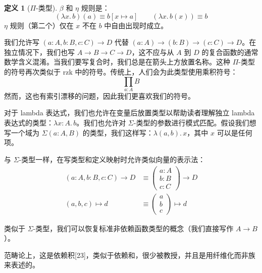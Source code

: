\documentclass{ctexrep}
\theoremstyle{plain}
\theoremstyle{definition}
\newtheorem{definition}[theorem]{定义}
\theoremstyle{remark}
\theoremstyle{definition}
\theoremstyle{definition}
\theoremstyle{definition}
\begin{document}
\begin{definition}[$\Pi$-类型]
$\beta$ 和 $\eta$ 规则是：
\[
(\lambda x.\,b)(a)\equiv b[x\mapsto a] \qquad (\lambda x.\,b(x))\equiv b
\]
$\eta$ 规则（第二个）仅在 $x$ 不在 $b$ 中自由出现时成立。

我们允许写 $(a:A,b:B,c:C)\to D$ 代替 $(a:A)\to (b:B)\to (c:C)\to D$。在独立情况下，我们也写 $A\to B\to C\to D$，这不应与从 $A$ 到 $D$ 的复合函数的通常数学含义混淆。当我们要写复合时，我们总是在箭头上方放置名称。这种 $\Pi$-类型的符号再次类似于 \textsf{rzk} 中的符号。传统上，人们会为此类型使用乘积符号：
\[
\prod_{a:A}B
\]
然而，这也有索引漂移的问题，因此我们更喜欢我们的符号。

对于 lambda 表达式，我们也允许在变量后放置类型以帮助读者理解独立 lambda 表达式的类型：$\lambda x:A.\,b$。我们也允许对 $\Sigma$-类型的参数进行模式匹配。假设我们想写一个域为 $\Sigma(a:A,B)$ 的类型，我们这样写：$\lambda (a,b).\,x$，其中 $x$ 可以是任何项。

与 $\Sigma$-类型一样，在写类型和定义映射时允许类似向量的表示法：
\begin{align*}
(a : A, b : B, c : C) \to D &\equiv 
\begin{pmatrix} 
a : A \\ 
b : B \\ 
c : C 
\end{pmatrix} \to D \\
(a, b, c) \mapsto d &\equiv 
\begin{pmatrix} 
a \\ 
b \\ 
c 
\end{pmatrix} \mapsto d
\end{align*}

类似于 $\Sigma$-类型，我们可以恢复标准非依赖函数类型的概念（我们直接写作 $A \to B$）。

范畴论上，这是依赖积[23]，类似于依赖和，很少被教授，并且是用纤维化而非族来表述的。
\end{definition}
\end{document}
